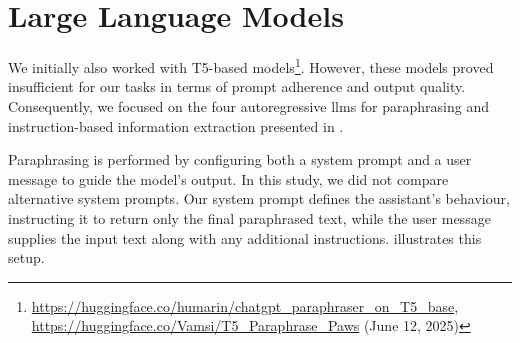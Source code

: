 \chapter{Large Language Models}
\label{app:language_models}

We initially also worked with T5-based models\footnote{\url{https://huggingface.co/humarin/chatgpt_paraphraser_on_T5_base},\\ \url{https://huggingface.co/Vamsi/T5_Paraphrase_Paws} (June 12, 2025)}. However, these models proved insufficient for our tasks in terms of prompt adherence and output quality. 
Consequently, we focused on the four autoregressive \acp{llm} for paraphrasing and instruction-based information extraction presented in .

\begin{table}[h]
\centering
\caption{Collection of multilingual \acp{llm} used for paraphrasing\protect\footnotemark.}
\label{tab:llm_paraphrasers}
\end{table}

Paraphrasing is performed by configuring both a system prompt and a user message to guide the model's output. 
In this study, we did not compare alternative system prompts. 
Our system prompt defines the assistant's behaviour, instructing it to return only the final paraphrased text, while the user message supplies the input text along with any additional instructions. 
 illustrates this setup.



